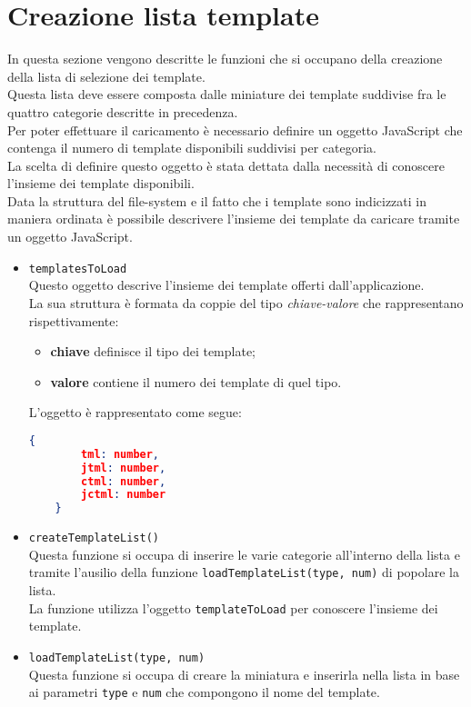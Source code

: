 \section{Creazione lista template}
In questa sezione vengono descritte le funzioni che si occupano della creazione della lista di selezione dei template.\\
Questa lista deve essere composta dalle miniature dei template suddivise fra le quattro categorie descritte in precedenza.\\
Per poter effettuare il caricamento è necessario definire un oggetto JavaScript che contenga il numero di template disponibili suddivisi per categoria.\\
La scelta di definire questo oggetto è stata dettata dalla necessità di conoscere l'insieme dei template disponibili.\\
Data la struttura del file-system e il fatto che i template sono indicizzati in maniera ordinata è possibile descrivere l'insieme dei template da caricare tramite un oggetto JavaScript.\\

\begin{itemize}
	\item \texttt{templatesToLoad} \label{ttlObject} \\
	Questo oggetto descrive l'insieme dei template offerti dall'applicazione.\\
	La sua struttura è formata da coppie del tipo \textit{chiave-valore} che rappresentano rispettivamente:
	\begin{itemize}
		\item \textbf{chiave} definisce il tipo dei template;
		\item \textbf{valore} contiene il numero dei template di quel tipo.
	\end{itemize}
	L'oggetto è rappresentato come segue:
	\begin{lstlisting}[language=JSON, caption= Struttura oggetto \texttt{templatesToLoad}.]
	{
		tml: number,
		jtml: number,
		ctml: number,
		jctml: number
	}
	\end{lstlisting}
	
	\item \texttt{createTemplateList()}\\
	Questa funzione si occupa di inserire le varie categorie all'interno della lista e tramite l'ausilio della funzione \texttt{loadTemplateList(type, num)} di popolare la lista.\\
	La funzione utilizza l'oggetto \texttt{templateToLoad} per conoscere l'insieme dei template.
	
	\item \texttt{loadTemplateList(type, num)}\\
	Questa funzione si occupa di creare la miniatura e inserirla nella lista in base ai parametri \texttt{type} e \texttt{num} che compongono il nome del template.
\end{itemize}

